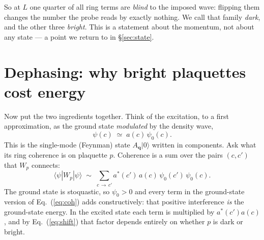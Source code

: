 \documentclass[11pt]{article}
\newcommand{\bq}{\bm q}
\newcommand{\Wp}{W_p}
\begin{document}
\noindent
So at $L$ one quarter of all ring terms are \emph{blind} to the imposed
wave: flipping them changes the number the probe reads by exactly
nothing. We call that family \emph{dark}, and the other three
\emph{bright}. This is a statement about the momentum, not about any
state --- a point we return to in \S\ref{sec:state}.

\section{Dephasing: why bright plaquettes cost energy}

Now put the two ingredients together. Think of the excitation, to a
first approximation, as the ground state \emph{modulated} by the density
wave,
\begin{equation}
\psi(c)\;\simeq\;a(c)\,\psi_0(c).
\label{eq:modulated}
\end{equation}
This is the single-mode (Feynman) state $A_{\bq}|0\rangle$ written in
components. Ask what its ring coherence is on plaquette $p$. Coherence
is a sum over the pairs $(c,c')$ that $\Wp$ connects:
\begin{equation}
\langle\psi|\Wp|\psi\rangle
\;\sim\;\sum_{c\,\to\,c'}a^*(c')\,a(c)\,\psi_0(c')\,\psi_0(c).
\label{eq:coh}
\end{equation}
The ground state is stoquastic, so $\psi_0>0$ and every term in the
ground-state version of Eq.~(\ref{eq:coh}) adds constructively: that
positive interference \emph{is} the ground-state energy. In the excited
state each term is multiplied by $a^*(c')a(c)$, and by
Eq.~(\ref{eq:shift}) that factor depends entirely on whether $p$ is dark
or bright.
\end{document}
